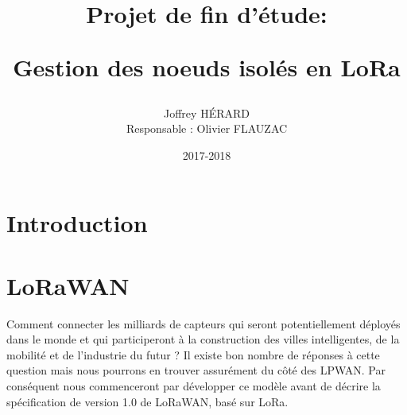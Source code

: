 \documentclass[11pt]{article}
\begin{document}
 \makeatletter
\def\maketitle{%
  \null
  \thispagestyle{empty}%
   \vfill
  \begin{center}\leavevmode
    \normalfont
    {\Huge \@title\par}%
    \vskip 3cm
    {\Large \@author\par}%
    \vskip 1cm
    {\Large \@date\par}%
  \end{center}%
  \vfill
  \null
  \cleardoublepage
  }
\makeatother
\title{\begin{center}Projet de fin d'étude:\end{center} Gestion des noeuds isolés en  LoRa }
\author{ Joffrey HÉRARD 
\begin{center}Responsable : Olivier FLAUZAC\end{center}}
\date{2017-2018}
\maketitle 
 
\tableofcontents 

\setlength{\parskip}{0.5em}
\newpage
\section{Introduction}

\newpage
\section{LoRaWAN}
Comment connecter les milliards de capteurs qui seront potentiellement déployés dans le monde et qui participeront à la construction des villes intelligentes, de la mobilité et de l'industrie du futur ? \newline
Il existe bon nombre de réponses à cette question mais nous pourrons en trouver assurément du côté des LPWAN. Par conséquent nous commenceront par développer ce modèle avant de décrire la spécification de version 1.0 de LoRaWAN, basé sur LoRa.
\end{document}
